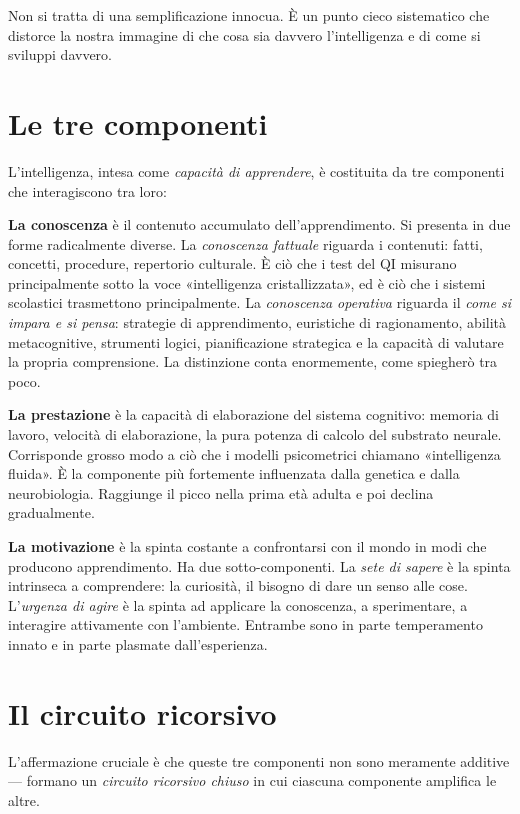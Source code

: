 \documentclass[11pt, twoside, openright]{book}
\begin{document}
Non si tratta di una semplificazione innocua. È un punto cieco sistematico che distorce la nostra immagine di che cosa sia davvero l'intelligenza e di come si sviluppi davvero.

\section*{Le tre componenti}

L'intelligenza, intesa come \textit{capacità di apprendere}, è costituita da tre componenti che interagiscono tra loro:

\textbf{La conoscenza} è il contenuto accumulato dell'apprendimento. Si presenta in due forme radicalmente diverse. La \textit{conoscenza fattuale} riguarda i contenuti: fatti, concetti, procedure, repertorio culturale. È ciò che i test del QI misurano principalmente sotto la voce «intelligenza cristallizzata», ed è ciò che i sistemi scolastici trasmettono principalmente. La \textit{conoscenza operativa} riguarda il \textit{come si impara e si pensa}: strategie di apprendimento, euristiche di ragionamento, abilità metacognitive, strumenti logici, pianificazione strategica e la capacità di valutare la propria comprensione. La distinzione conta enormemente, come spiegherò tra poco.

\textbf{La prestazione} è la capacità di elaborazione del sistema cognitivo: memoria di lavoro, velocità di elaborazione, la pura potenza di calcolo del substrato neurale. Corrisponde grosso modo a ciò che i modelli psicometrici chiamano «intelligenza fluida». È la componente più fortemente influenzata dalla genetica e dalla neurobiologia. Raggiunge il picco nella prima età adulta e poi declina gradualmente.

\textbf{La motivazione} è la spinta costante a confrontarsi con il mondo in modi che producono apprendimento. Ha due sotto-componenti. La \textit{sete di sapere} è la spinta intrinseca a comprendere: la curiosità, il bisogno di dare un senso alle cose. L'\textit{urgenza di agire} è la spinta ad applicare la conoscenza, a sperimentare, a interagire attivamente con l'ambiente. Entrambe sono in parte temperamento innato e in parte plasmate dall'esperienza.

\section*{Il circuito ricorsivo}

L'affermazione cruciale è che queste tre componenti non sono meramente additive --- formano un \textit{circuito ricorsivo chiuso} in cui ciascuna componente amplifica le altre.
\end{document}
